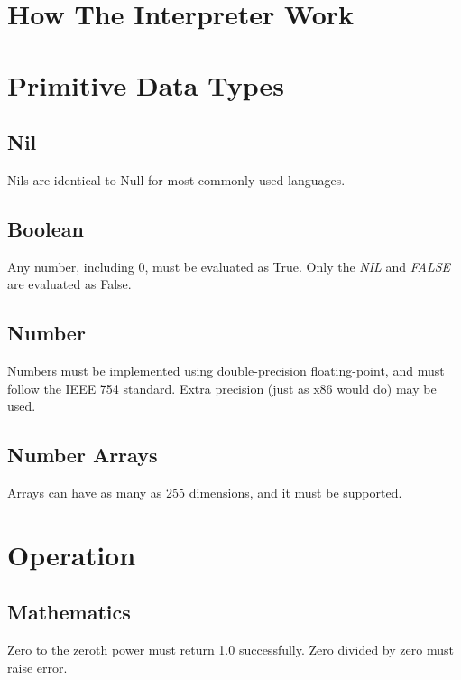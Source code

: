 \section{How The Interpreter Work}



\section{Primitive Data Types}

\subsection{Nil}
Nils are identical to Null for most commonly used languages.

\subsection{Boolean}
Any number, including 0, must be evaluated as True. Only the \emph{NIL} and \emph{FALSE} are evaluated as False.

\subsection{Number}
Numbers must be implemented using double-precision floating-point, and must follow the IEEE 754 standard. Extra precision (just as x86 would do) may be used.

\subsection{Number Arrays}
Arrays can have as many as 255 dimensions, and it must be supported.



\section{Operation}

\subsection{Mathematics}
Zero to the zeroth power must return 1.0 successfully. Zero divided by zero must raise  error.
